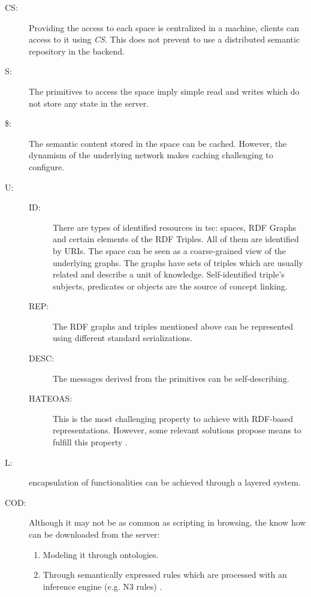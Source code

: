 \begin{description}
 \item[CS:] Providing the access to each space is centralized in a machine, clients can access to it using \emph{CS}.
           This does not prevent to use a distributed semantic repository in the backend.
 \item[S:] The primitives to access the space imply simple read and writes which do not store any state in the server.
 \item[\$:] The semantic content stored in the space can be cached.
           However, the dynamism of the underlying network makes caching challenging to configure. %
 \item[U:]
    \begin{description}
	\item[ID:] There are types of identified resources in \ac{tsc}: spaces, RDF Graphs and certain elements of the RDF Triples.
	                 All of them are identified by URIs.
	                 The space can be seen as a coarse-grained view of the underlying graphs. %
	                 The graphs have sets of triples which are usually related and describe a unit of knowledge. %
	                 Self-identified triple's subjects, predicates or objects are the source of concept linking.
	\item[REP:] The RDF graphs and triples mentioned above can be represented using different standard serializations.
	\item[DESC:] The messages derived from the primitives can be self-describing.
	\item[HATEOAS:] This is the most challenging property to achieve with RDF-based representations.
	                      However, some relevant solutions propose means to fulfill this property \cite{verborgh_functional_2012}. %
    \end{description}
 \item[L:] encapsulation of functionalities can be achieved through a layered system.
 \item[COD:] Although it may not be as common as scripting in browsing,
            the know how can be downloaded from the server:
            \begin{enumerate}
	      \item Modeling it through ontologies.
	      \item Through semantically expressed rules which are processed with an inference engine (e.g. N3 rules) \citep{verborgh_functional_2012}.
            \end{enumerate}
\end{description}


